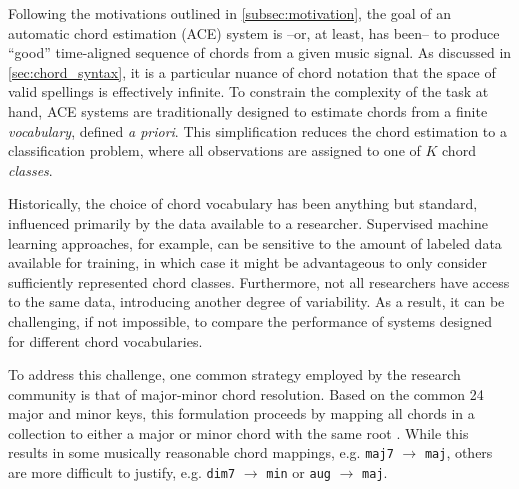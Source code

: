 Following the motivations outlined in \ref{subsec:motivation}, the goal of an automatic chord estimation (ACE) system is --or, at least, has been-- to produce ``good'' time-aligned sequence of chords from a given music signal.
As discussed in \ref{sec:chord_syntax}, it is a particular nuance of chord notation that the space of valid spellings is effectively infinite.
To constrain the complexity of the task at hand, ACE systems are traditionally designed to estimate chords from a finite \emph{vocabulary}, defined \emph{a priori}.
This simplification reduces the chord estimation to a classification problem, where all observations are assigned to one of $K$ chord \emph{classes}.

Historically, the choice of chord vocabulary has been anything but standard, influenced primarily by the data available to a researcher.
Supervised machine learning approaches, for example, can be sensitive to the amount of labeled data available for training, in which case it might be advantageous to only consider sufficiently represented chord classes.
Furthermore, not all researchers have access to the same data, introducing another degree of variability.
As a result, it can be challenging, if not impossible, to compare the performance of systems designed for different chord vocabularies.

To address this challenge, one common strategy employed by the research community is that of major-minor chord resolution.
Based on the common 24 major and minor keys, this formulation proceeds by mapping all chords in a collection to either a major or minor chord with the same root \cite{McVicar2013Machine}.
While this results in some musically reasonable chord mappings, e.g. \texttt{maj7} $\to$ \texttt{maj}, others are more difficult to justify, e.g. \texttt{dim7} $\to$ \texttt{min} or \texttt{aug} $\to$ \texttt{maj}.

